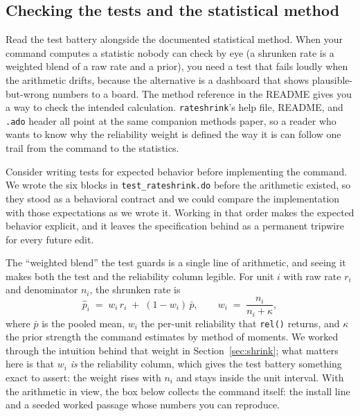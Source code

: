 \subsection{Checking the tests and the statistical method}\label{sec:ch15-trust-rows}
Read the test battery alongside the documented statistical method. When your command computes a statistic nobody can check by eye (a shrunken rate is a weighted blend of a raw rate and a prior), you need a test that fails loudly when the arithmetic drifts, because the alternative is a dashboard that shows plausible-but-wrong numbers to a board. The method reference in the README gives you a way to check the intended calculation. \texttt{rateshrink}'s help file, README, and \texttt{.ado} header all point at the same companion methods paper, so a reader who wants to know why the reliability weight is defined the way it is can follow one trail from the command to the statistics.

Consider writing tests for expected behavior before implementing the command. We wrote the six blocks in \texttt{test\_rateshrink.do} before the arithmetic existed, so they stood as a behavioral contract and we could compare the implementation with those expectations as we wrote it. Working in that order makes the expected behavior explicit, and it leaves the specification behind as a permanent tripwire for every future edit.

The \enquote{weighted blend} the test guards is a single line of arithmetic, and seeing it makes both the test and the reliability column legible. For unit $i$ with raw rate $r_i$ and denominator $n_i$, the shrunken rate is
\[
  \hat{p}_i \;=\; w_i\,r_i \;+\; (1-w_i)\,\bar{p},
  \qquad
  w_i \;=\; \frac{n_i}{n_i + \kappa},
\]
where $\bar p$ is the pooled mean, $w_i$ the per-unit reliability that \texttt{rel()} returns, and $\kappa$ the prior strength the command estimates by method of moments. We worked through the intuition behind that weight in Section~\ref{sec:shrink}; what matters here is that $w_i$ \emph{is} the reliability column, which gives the test battery something exact to assert: the weight rises with $n_i$ and stays inside the unit interval. With the arithmetic in view, the box below collects the command itself: the install line and a seeded worked passage whose numbers you can reproduce.

